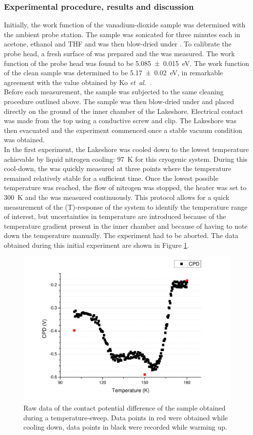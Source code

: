 \subsubsection{Experimental procedure, results and discussion}
Initially, the work function of the vanadium-dioxide sample was determined with the ambient probe station. The sample was sonicated for three minutes each in acetone, ethanol and THF and was then blow-dried under \nitro{}. To calibrate the probe head, a fresh surface of \hopg{} was prepared and the \cpd{} was measured. The work function of the probe head was found to be \SI{5.085+-0.015}{\electronvolt}. The work function of the clean \wvadiox{} sample was determined to be \SI{5.17+-0.02}{\electronvolt}, in remarkable agreement with the value obtained by Ko \emph{et~al.}~\cite{ko_kp}.\\
Before each measurement, the sample was subjected to the same cleaning procedure outlined above. The sample was then blow-dried under \nitro{} and placed directly on the ground of the inner chamber of the Lakeshore. Electrical contact was made from the top using a conductive screw and clip. The Lakeshore was then evacuated and the experiment commenced once a stable vacuum condition was obtained.\\
In the first experiment, the Lakeshore was cooled down to the lowest temperature achievable by liquid nitrogen cooling: \SI{97}{\kelvin} for this cryogenic system. During this cool-down, the \cpd{} was quickly measured at three points where the temperature remained relatively stable for a sufficient time. Once the lowest possible temperature was reached, the flow of nitrogen was stopped, the heater was set to \SI{300}{\kelvin} and the \cpd{} was measured continuously. This protocol allows for a quick measurement of the \cpd{}(T)-response of the system to identify the temperature range of interest, but uncertainties in temperature are introduced because of the temperature gradient present in the inner chamber and because of having to note down the temperature manually. The experiment had to be aborted. The data obtained during this initial experiment are shown in Figure \ref{fig:vox1}.\\
\begin{figure}
\centering
	\includegraphics[width=0.8\linewidth]{./figs/chap2/vox1}
	\caption{Raw data of the contact potential difference of the \wvadiox{} sample obtained during a temperature-sweep. Data points in red were obtained while cooling down, data points in black were recorded while warming up.}
	\label{fig:vox1}
\end{figure}
